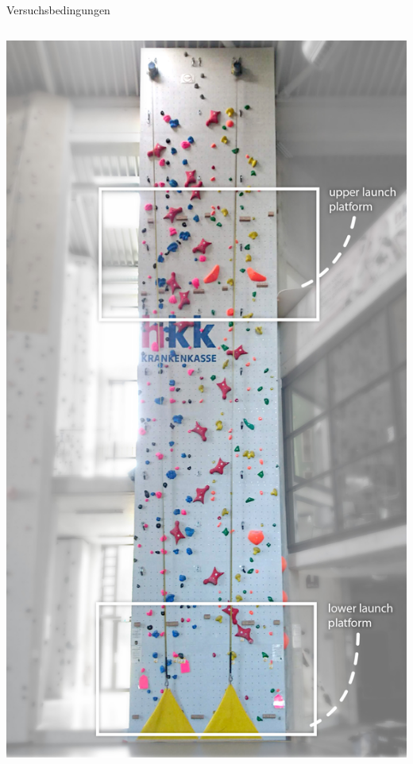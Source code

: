 \begin{frame}{Versuchsbedingungen}
\begin{columns}
\begin{column}{0.5\textwidth}
\begin{center}
			\includegraphics[height=1.2\textheight]{include/images/climbing-wall-photo.jpg}
		\end{center}
	\end{column}
\end{columns}
\end{frame}

\begin{frame}[standout]
	\begin{center}
		{\fontsize{60}{60}}
	\end{center}
\end{frame}

